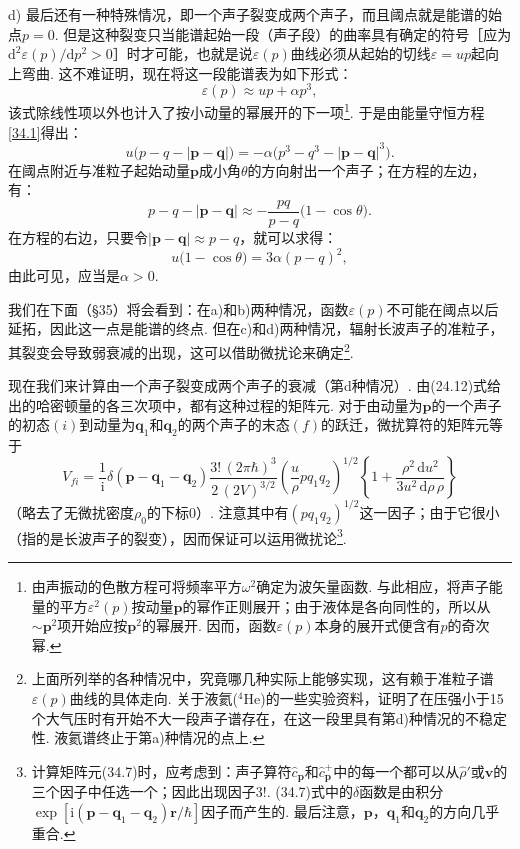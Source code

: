 d) 最后还有一种特殊情况，即一个声子裂变成两个声子，而且阈点就是能谱的始点$p=0$. 但是这种裂变只当能谱起始一段（声子段）的曲率具有确定的符号［应为$\mathrm{d}^{2}\varepsilon(p)/\mathrm{d}p^{2}>0$］时才可能，也就是说$\varepsilon(p)$曲线必须从起始的切线$\varepsilon=up$起向上弯曲. 这不难证明，现在将这一段能谱表为如下形式：
\begin{equation}
\varepsilon(p)\approx up+\alpha p^{3},
\label{34.4}
\end{equation}
该式除线性项以外也计入了按小动量的幂展开的下一项\footnote{由声振动的色散方程可将频率平方$\omega^{2}$确定为波矢量函数. 与此相应，将声子能量的平方$\varepsilon^{2}(p)$按动量$\bm{p}$的幂作正则展开；由于液体是各向同性的，所以从$\sim\bm{p}^{2}$项开始应按$\bm{p}^{2}$的幂展开. 因而，函数$\varepsilon(p)$本身的展开式便含有$p$的奇次幂.}. 于是由能量守恒方程\eqref{34.1}得出：
\begin{equation*}
u\big(p-q-|\bm{p}-\bm{q}|\big)
=-\alpha\big(p^{3}-q^{3}-|\bm{p}-\bm{q}|^{3}\big).
\end{equation*}
在阈点附近与准粒子起始动量$\bm{p}$成小角$\theta$的方向射出一个声子；在方程的左边，有：
\begin{equation}
p-q-|\bm{p}-\bm{q}|\approx-\frac{pq}{p-q}\big(1-\cos\theta\big).
\label{34.5}
\end{equation}
在方程的右边，只要令$|\bm{p}-\bm{q}|\approx p-q$，就可以求得：
\begin{equation}
u\big(1-\cos\theta\big)=3\alpha(p-q)^{2},
\label{34.6}
\end{equation}
由此可见，应当是$\alpha>0$.

我们在下面（§35）将会看到：在a)和b)两种情况，函数$\varepsilon(p)$不可能在阈点以后延拓，因此这一点是能谱的终点. 但在c)和d)两种情况，辐射长波声子的准粒子，其裂变会导致弱衰减的出现，这可以借助微扰论来确定\footnote{上面所列举的各种情况中，究竟哪几种实际上能够实现，这有赖于准粒子谱$\varepsilon(p)$曲线的具体走向. 关于液氦($^{4}$He)的一些实验资料，证明了在压强小于15个大气压时有开始不大一段声子谱存在，在这一段里具有第d)种情况的不稳定性. 液氦谱终止于第a)种情况的点上.}.

现在我们来计算由一个声子裂变成两个声子的衰减（第d种情况）. 由(24.12)式给出的哈密顿量的各三次项中，都有这种过程的矩阵元. 对于由动量为$\bm{p}$的一个声子的初态$(i)$到动量为$\bm{q}_{1}$和$\bm{q}_{2}$的两个声子的末态$(f)$的跃迁，微扰算符的矩阵元等于
\begin{equation}
V_{fi}=\frac{1}{\mathrm{i}}\delta(\bm{p}-\bm{q}_{1}-\bm{q}_{2})
\frac{3!\,(2\pi\hbar)^{3}}{2\,(2V)^{3/2}}
\left(\frac{u}{\rho}pq_{1}q_{2}\right)^{1/2}
\left\{1+\frac{\rho^{2}\,\mathrm{d}u^{2}}{3u^{2}\,\mathrm{d}\rho\,\rho}\right\}
\label{34.7}
\end{equation}
（略去了无微扰密度$\rho_{0}$的下标0）. 注意其中有$(pq_{1}q_{2})^{1/2}$这一因子；由于它很小（指的是长波声子的裂变），因而保证可以运用微扰论\footnote{计算矩阵元(34.7)时，应考虑到：声子算符$\hat{c}_{\bm{p}}$和$\hat{c}^{+}_{\bm{p}}$中的每一个都可以从$\hat{\rho}'$或$\bm{v}$的三个因子中任选一个；因此出现因子3!. (34.7)式中的$\delta$函数是由积分$\exp[\mathrm{i}(\bm{p}-\bm{q}_{1}-\bm{q}_{2})\bm{r}/\hbar]$因子而产生的. 最后注意，$\bm{p}$，$\bm{q}_{1}$和$\bm{q}_{2}$的方向几乎重合.}.

